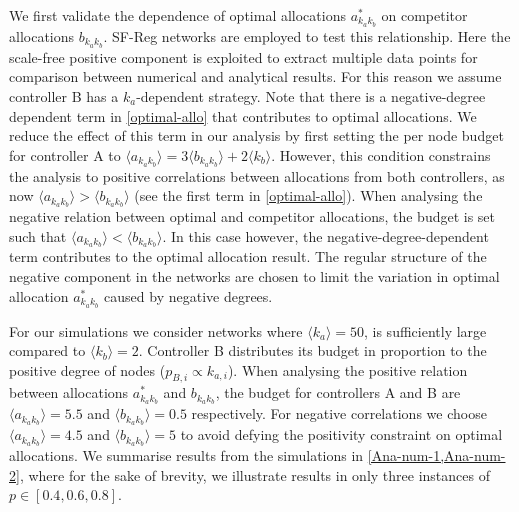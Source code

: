 We first validate the dependence of optimal allocations $a_{k_{a}k_{b}}^*$ on competitor allocations $b_{k_{a}k_{b}}$. SF-Reg networks are employed to test this relationship. Here the scale-free positive component is exploited to extract multiple data points for comparison between numerical and analytical results. For this reason we assume controller B has a $k_{a}$-dependent strategy. 
Note that there is a negative-degree dependent term in \cref{optimal-allo} that contributes to optimal allocations. We reduce the effect of this term in our analysis by first setting the per node budget for controller A to $\langle a_{k_{a}k_{b}} \rangle = 3\langle b_{k_{a}k_{b}} \rangle + 2\langle k_{b} \rangle$. However, this condition constrains the analysis to positive correlations between allocations from both controllers, as now $\langle a_{k_{a}k_{b}} \rangle > \langle b_{k_{a}k_{b}} \rangle$ (see the first term in \cref{optimal-allo}). When analysing the negative relation between optimal and competitor allocations, the budget is set such that $\langle a_{k_{a}k_{b}} \rangle < \langle b_{k_{a}k_{b}} \rangle$. In this case however, the negative-degree-dependent term contributes to the optimal allocation result. The regular structure of the negative component in the networks are chosen to limit the variation in optimal allocation $a_{k_{a}k_{b}}^*$ caused by negative degrees.

For our simulations we consider networks where $\langle k_{a} \rangle=50$, is sufficiently large compared to $\langle k_{b} \rangle=2$. Controller B distributes its budget in proportion to the positive degree of nodes ($p_{B,i} \propto k_{a,i}$). When analysing the positive relation between allocations $a_{k_{a}k_{b}}^*$ and $b_{k_{a}k_{b}}$, the budget for controllers A and B are $\langle a_{k_{a}k_{b}} \rangle=5.5$ and $\langle b_{k_{a}k_{b}} \rangle=0.5$ respectively. For negative correlations we choose $\langle a_{k_{a}k_{b}} \rangle=4.5$ and $\langle b_{k_{a}k_{b}} \rangle=5$ to avoid defying the positivity constraint on optimal allocations. We summarise results from the simulations in \cref{Ana-num-1,Ana-num-2}, where for the sake of brevity, we illustrate results in only three instances of $p \in [0.4,0.6,0.8]$.

